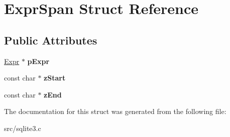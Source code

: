 \hypertarget{struct_expr_span}{\section{Expr\-Span Struct Reference}
\label{struct_expr_span}
}
\subsection*{Public Attributes}
\begin{DoxyCompactItemize}
\item 
\hypertarget{struct_expr_span_a081c4aa031331c8518c1173b2a8335cc}{\hyperlink{struct_expr}{Expr} $\ast$ {\bfseries p\-Expr}}\label{struct_expr_span_a081c4aa031331c8518c1173b2a8335cc}

\item 
\hypertarget{struct_expr_span_af4653638d7e67a62e7a607f682b38e25}{const char $\ast$ {\bfseries z\-Start}}\label{struct_expr_span_af4653638d7e67a62e7a607f682b38e25}

\item 
\hypertarget{struct_expr_span_a7cdf42cea729fcb5a1c477c3825ab575}{const char $\ast$ {\bfseries z\-End}}\label{struct_expr_span_a7cdf42cea729fcb5a1c477c3825ab575}

\end{DoxyCompactItemize}


The documentation for this struct was generated from the following file\-:\begin{DoxyCompactItemize}
\item 
src/sqlite3.\-c\end{DoxyCompactItemize}
